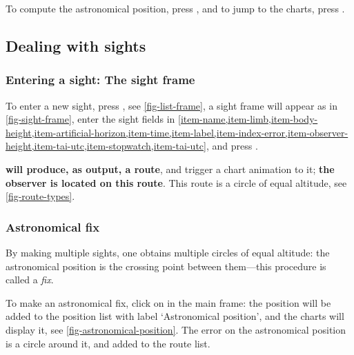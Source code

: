 \documentclass{ol-softwaremanual}
\begin{document}
To compute the astronomical position, press , and to jump to the charts, press .  

\subsection{Dealing with sights}

\subsubsection{Entering a sight: The sight frame}


To enter a new sight, press  , see \cref{fig-list-frame}, a sight frame will appear as in \cref{fig-sight-frame}, enter the sight fields in  \cref{item-name,item-limb,item-body-height,item-artificial-horizon,item-time,item-label,item-index-error,item-observer-height,item-tai-utc,item-stopwatch,item-tai-utc}, and press . 

\textbf{\thel will produce, as output, a route}, and trigger a chart animation to it; \textbf{the observer is located  on this route}. This route is a circle of equal altitude, see \cref{fig-route-types}. 

\subsubsection{Astronomical fix}

By making multiple sights, one obtains multiple circles of equal altitude: the astronomical position is the crossing point between them---this procedure is called a \textit{fix}. 

To make an astronomical fix, click on  in the main frame: the position will be added to the position list with label `Astronomical position', and the charts will display it, see \cref{fig-astronomical-position}. The error on the astronomical position is a circle around it, and added to the route list. 
\end{document}
